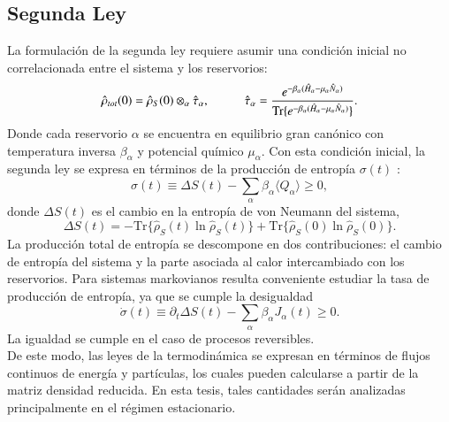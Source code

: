 \subsection{Segunda Ley}
La formulación de la segunda ley requiere asumir una condición inicial no correlacionada entre el sistema y los reservorios:
\begin{equation*}
    \hat{\rho}_{tot}(0) = \hat{\rho}_{S}(0)\otimes_{\alpha}\hat{\tau}_{\alpha}, 
    \hspace{10mm}  
    \hat{\tau}_{\alpha} = \frac{e^{-\beta_{\alpha}(\hat{H}_{\alpha}-\mu_{\alpha}\hat{N}_{\alpha}) }}
    {\text{Tr}\{e^{-\beta_{\alpha}(\hat{H}_{\alpha} - \mu_{\alpha}\hat{N}_{\alpha})}\} }.
\end{equation*}
Donde cada reservorio $\alpha$ se encuentra en equilibrio gran canónico con temperatura inversa $\beta_{\alpha}$ y potencial químico $\mu_{\alpha}$. Con esta condición inicial, la segunda ley se expresa en términos de la producción de entropía $\sigma(t)$ \cite{esposito2010entropy}:
\begin{equation*}
    \sigma(t) \equiv \Delta S(t) - \sum_{\alpha}\beta_{\alpha}\langle Q_{\alpha}\rangle \geq 0,
\end{equation*}
donde $\Delta S(t)$ es el cambio en la entropía de von Neumann del sistema,
\begin{equation*}
    \Delta S(t) = -  \text{Tr}\{\hat{\rho}_{S}(t)\ln \hat{\rho}_{S}(t) \} 
    +  \text{Tr}\{ \hat{\rho}_{S}(0)\ln \hat{\rho}_{S}(0) \}.
\end{equation*}
La producción total de entropía se descompone en dos contribuciones: el cambio de entropía del sistema y la parte asociada al calor intercambiado con los reservorios. Para sistemas markovianos resulta conveniente estudiar la tasa de producción de entropía, ya que se cumple la desigualdad \cite{strasberg2019non}
\begin{equation*}
    \dot{\sigma}(t) \equiv \partial_{t}\Delta S(t) - \sum_{\alpha}\beta_{\alpha}J_{\alpha}(t) \geq 0.
\end{equation*}
La igualdad se cumple en el caso de procesos reversibles.  
\\

De este modo, las leyes de la termodinámica se expresan en términos de flujos continuos de energía y partículas, los cuales pueden calcularse a partir de la matriz densidad reducida. En esta tesis, tales cantidades serán analizadas principalmente en el régimen estacionario.
\label{sec3sub:leyestermo}



